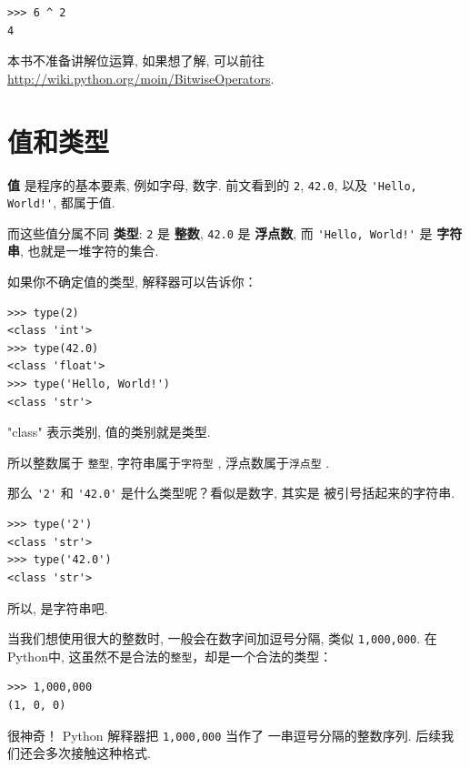 \documentclass[10pt]{book}
\begin{document}
\begin{verbatim}
>>> 6 ^ 2
4
\end{verbatim}
%

本书不准备讲解位运算, 如果想了解, 可以前往 
\url{http://wiki.python.org/moin/BitwiseOperators}. 


\section{值和类型}


 {\bf 值} 是程序的基本要素, 例如字母, 数字. 前文看到的
 {\tt 2}, {\tt 42.0}, 以及 \verb"'Hello, World!'", 都属于值. 

而这些值分属不同 {\bf 类型}:
{\tt 2} 是 {\bf 整数}, 
{\tt 42.0} 是 {\bf 浮点数}, 
而 \verb"'Hello, World!'" 是 {\bf 字符串}, 也就是一堆字符的集合. 

如果你不确定值的类型, 解释器可以告诉你：

\begin{verbatim}
>>> type(2)
<class 'int'>
>>> type(42.0)
<class 'float'>
>>> type('Hello, World!')
<class 'str'>
\end{verbatim}
%

"class" 表示类别, 值的类别就是类型. 


所以整数属于 {\tt 整型}, 字符串属于{\tt 字符型} , 浮点数属于{\tt 浮点型} . 

那么 \verb"'2'" 和 \verb"'42.0'" 是什么类型呢？看似是数字, 其实是
被引号括起来的字符串. 

\begin{verbatim}
>>> type('2')
<class 'str'>
>>> type('42.0')
<class 'str'>
\end{verbatim}
%
所以, 是字符串吧. 

当我们想使用很大的整数时, 一般会在数字间加逗号分隔, 类似 {\tt 1,000,000}. 
在Python中, 这虽然不是合法的{\tt 整型}，却是一个合法的类型：

\begin{verbatim}
>>> 1,000,000
(1, 0, 0)
\end{verbatim}
%

很神奇！ Python 解释器把 {\tt 1,000,000} 当作了
一串逗号分隔的整数序列. 后续我们还会多次接触这种格式. 
\end{document}
